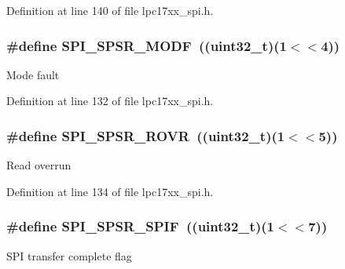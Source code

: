 \-Definition at line 140 of file lpc17xx\-\_\-spi.\-h.

\hypertarget{group___s_p_i___private___macros_ga96d682cc12df75a8993c4bc5af6313a2}{
\subsubsection[{\-S\-P\-I\-\_\-\-S\-P\-S\-R\-\_\-\-M\-O\-D\-F}]{\setlength{\rightskip}{0pt plus 5cm}\#define {\bf \-S\-P\-I\-\_\-\-S\-P\-S\-R\-\_\-\-M\-O\-D\-F}~((uint32\-\_\-t)(1$<$$<$4))}}\label{group___s_p_i___private___macros_ga96d682cc12df75a8993c4bc5af6313a2}
\-Mode fault 

\-Definition at line 132 of file lpc17xx\-\_\-spi.\-h.

\hypertarget{group___s_p_i___private___macros_gaf1751e5dd5a9ac89397a957d90f3e911}{
\subsubsection[{\-S\-P\-I\-\_\-\-S\-P\-S\-R\-\_\-\-R\-O\-V\-R}]{\setlength{\rightskip}{0pt plus 5cm}\#define {\bf \-S\-P\-I\-\_\-\-S\-P\-S\-R\-\_\-\-R\-O\-V\-R}~((uint32\-\_\-t)(1$<$$<$5))}}\label{group___s_p_i___private___macros_gaf1751e5dd5a9ac89397a957d90f3e911}
\-Read overrun 

\-Definition at line 134 of file lpc17xx\-\_\-spi.\-h.

\hypertarget{group___s_p_i___private___macros_gad42ab0064435d5362a0fb61cfde34780}{
\subsubsection[{\-S\-P\-I\-\_\-\-S\-P\-S\-R\-\_\-\-S\-P\-I\-F}]{\setlength{\rightskip}{0pt plus 5cm}\#define {\bf \-S\-P\-I\-\_\-\-S\-P\-S\-R\-\_\-\-S\-P\-I\-F}~((uint32\-\_\-t)(1$<$$<$7))}}\label{group___s_p_i___private___macros_gad42ab0064435d5362a0fb61cfde34780}
\-S\-P\-I transfer complete flag 

